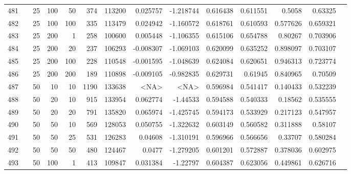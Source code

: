 \begin{longtable}{llrrrrrrrrrrrr}
		481 & &           25 &               100 &           50 &          374 &     113200 &  0.025757 & -1.218744 &  0.616438 &    0.611551 &         0.5058 &   0.63325 \\
		482 & &           25 &               100 &          100 &          335 &     113479 &  0.024942 & -1.160572 &  0.618761 &    0.610593 &       0.577626 &  0.659321 \\
		483 & &           25 &               200 &            1 &          258 &     100600 &  0.005448 & -1.106355 &  0.615106 &    0.654788 &        0.80267 &  0.703906 \\
		484 & &           25 &               200 &           20 &          237 &     106293 & -0.008307 & -1.069103 &  0.620099 &    0.635252 &       0.898097 &  0.703107 \\
		485 & &           25 &               200 &          100 &          228 &     110548 & -0.001595 & -1.048639 &  0.624084 &    0.620651 &       0.946313 &  0.723774 \\
		486 & &           25 &               200 &          200 &          189 &     110898 & -0.009105 & -0.982835 &  0.629731 &     0.61945 &       0.840965 &   0.70509 \\
		487 & &           50 &                10 &           10 &           1190 &     133638 &      <NA> &      <NA> &  0.596984 &    0.541417 &       0.140433 &  0.532239 \\
		488 & &           50 &                20 &           10 &          915 &     133954 &  0.062774 &  -1.44533 &  0.594588 &    0.540333 &        0.18562 &  0.535555 \\
		489 & &           50 &                20 &           20 &          791 &     135820 &  0.065974 & -1.425745 &  0.594173 &    0.533929 &       0.217123 &  0.547957 \\
		490 & &           50 &                50 &           10 &          569 &     128053 &  0.050755 & -1.322632 &  0.603149 &    0.560582 &       0.311888 &   0.58107 \\
		491 & &           50 &                50 &           25 &          531 &     126283 &   0.04608 & -1.310191 &  0.596966 &    0.566656 &        0.33707 &  0.580284 \\
		492 & &           50 &                50 &           50 &          480 &     124467 &    0.0477 & -1.279205 &  0.601201 &    0.572887 &       0.378036 &  0.602975 \\
		493 & &           50 &               100 &            1 &          413 &     109847 &  0.031384 &  -1.22797 &  0.604387 &    0.623056 &       0.449861 &  0.626716 \\

\end{longtable}
